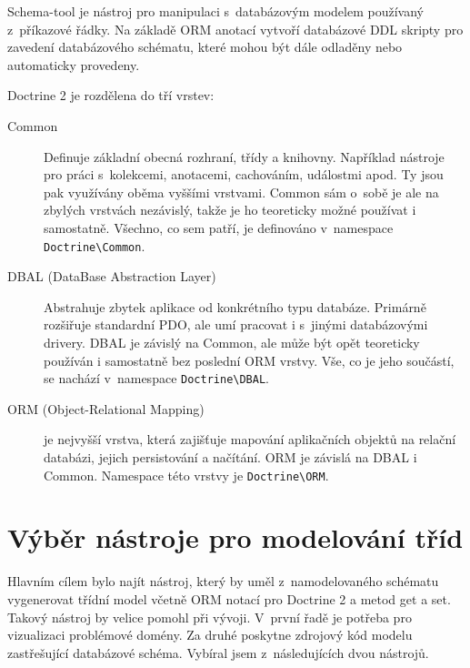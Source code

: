 \documentclass[thesis=B,czech]{FITthesis}[2012/06/26]
\begin{document}
	Schema-tool je nástroj pro manipulaci s~databázovým modelem používaný z~příkazové řádky. Na základě ORM anotací vytvoří databázové DDL skripty pro zavedení databázového schématu, které mohou být dále odladěny nebo automaticky provedeny.
	
	Doctrine 2 je rozdělena do tří vrstev:
	\begin{description}
		\item[Common] Definuje základní obecná rozhraní, třídy a knihovny. Například nástroje pro práci s~kolekcemi, anotacemi, cachováním, událostmi apod. Ty jsou pak využívány oběma vyššími vrstvami. Common sám o~sobě je ale na zbylých vrstvách nezávislý, takže je ho teoreticky možné používat i samostatně. Všechno, co sem patří, je definováno v~namespace \verb|Doctrine\Common|.
		\item[DBAL (DataBase Abstraction Layer)] Abstrahuje zbytek aplikace od konkrétního typu databáze. Primárně rozšiřuje standardní PDO, ale umí pracovat i s~jinými databázovými drivery. DBAL je závislý na Common, ale může být opět teoreticky používán i samostatně bez poslední ORM vrstvy. Vše, co je jeho součástí, se nachází v~namespace \verb|Doctrine\DBAL|.
		\item[ORM (Object-Relational Mapping)] je nejvyšší vrstva, která zajišťuje mapování aplikačních objektů na relační databázi, jejich persistování a načítání. ORM je závislá na DBAL i Common. Namespace této vrstvy je \verb|Doctrine\ORM|.\cite{doctrine2}
	\end{description}

\section{Výběr nástroje pro modelování tříd}
	Hlavním cílem bylo najít nástroj, který by uměl z~namodelovaného schématu vygenerovat třídní model včetně ORM notací pro Doctrine 2 a metod get a set. Takový nástroj by velice pomohl při vývoji. V~první řadě je potřeba pro vizualizaci problémové domény. Za druhé poskytne zdrojový kód modelu zastřešující databázové schéma. Vybíral jsem z~následujících dvou nástrojů.
\end{document}
